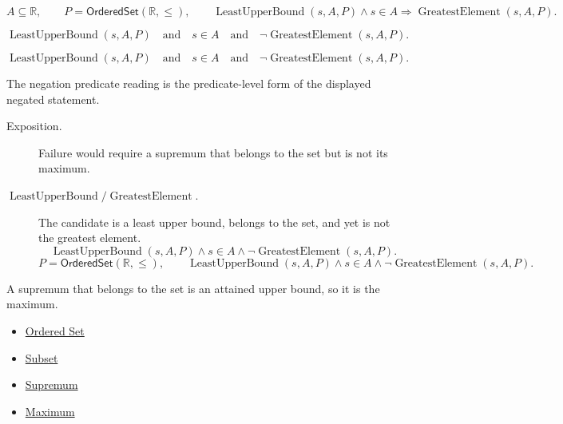 \begin{remark*}
\[
  A\subseteq\mathbb{R},\qquad P=\mathsf{OrderedSet}(\mathbb{R},\leq),\qquad
  \operatorname{LeastUpperBound}(s,A,P)\land s\in A
  \Longrightarrow \operatorname{GreatestElement}(s,A,P).
\]
\end{remark*}

\begin{remark*}
\[
  \operatorname{LeastUpperBound}(s,A,P)
  \quad\text{and}\quad
  s\in A
  \quad\text{and}\quad
  \neg\operatorname{GreatestElement}(s,A,P).
\]
\end{remark*}

\begin{remark*}
\[
  \operatorname{LeastUpperBound}(s,A,P)
  \quad\text{and}\quad
  s\in A
  \quad\text{and}\quad
  \neg\operatorname{GreatestElement}(s,A,P).
\]

The negation predicate reading is the predicate-level form of the displayed negated statement.
\end{remark*}

\begin{remark*}
\begin{description}
  \item[Exposition.]
  Failure would require a supremum that belongs to the set but is not its
  maximum.

  \item[\(\operatorname{LeastUpperBound} / \operatorname{GreatestElement}.\)]
  The candidate is a least upper bound, belongs to the set, and yet is not
  the greatest element.
  \[
    \operatorname{LeastUpperBound}(s,A,P)\land s\in A\land
    \neg\operatorname{GreatestElement}(s,A,P).
  \]
  \[
    P=\mathsf{OrderedSet}(\mathbb{R},\leq),\qquad
    \operatorname{LeastUpperBound}(s,A,P)\land s\in A\land
    \neg\operatorname{GreatestElement}(s,A,P).
  \]
\end{description}
\end{remark*}

\begin{remark*}[Interpretation]
A supremum that belongs to the set is an attained upper bound, so it is the
maximum.
\end{remark*}

\begin{dependencies}
\begin{itemize}
  \item \hyperref[def:ordered-set]{Ordered Set}
  \item \hyperref[def:subset]{Subset}
  \item \hyperref[def:supremum]{Supremum}
  \item \hyperref[def:maximum]{Maximum}
\end{itemize}
\end{dependencies}

